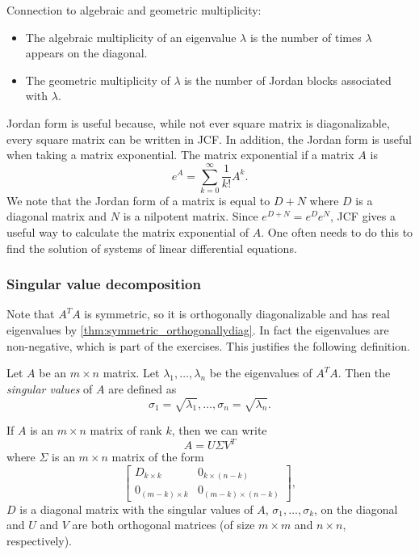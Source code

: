 \documentclass{article}
\begin{document}
Connection to algebraic and geometric multiplicity:
\begin{itemize}
    \item The algebraic multiplicity of an eigenvalue $\lambda$ is the number of times $\lambda$ appears on the diagonal.
    \item The geometric multiplicity of $\lambda$ is the number of Jordan blocks associated with $\lambda$.
\end{itemize}

Jordan form is useful because, while not ever square matrix is diagonalizable, every square matrix can be written in JCF. 
In addition, the Jordan form is useful when taking a matrix exponential. The matrix exponential if a matrix $A$ is
$$ e^A = \sum_{k=0}^\infty \frac{1}{k!}A^k.$$
We note that the Jordan form of a matrix is equal to $D + N$ where $D$ is a diagonal matrix and $N$ is a nilpotent matrix. Since $e^{D+N}=e^De^N$, JCF gives a useful way to calculate the matrix exponential of $A$. One often needs to do this to find the solution of systems of linear differential equations.


\subsubsection{Singular value decomposition}
Note that $A^T A$ is symmetric, so it is orthogonally diagonalizable and has real eigenvalues by \cref{thm:symmetric_orthogonallydiag}. In fact the eigenvalues are non-negative, which is part of the exercises. This justifies the following definition.

\begin{definition}
Let $A$ be an $m \times n$ matrix.  Let $\lambda_1, \ldots, \lambda_n$ be the eigenvalues of $A^T A$. Then the \emph{singular values} of $A$ are defined as
\begin{equation*}
    \sigma_1 = \sqrt{\lambda_1}, \ldots, \sigma_n = \sqrt{\lambda_n}.
\end{equation*}
\end{definition}

\begin{theorem}
If $A$ is an $m \times n$ matrix of rank $k$, then we can write
$$ A = U \Sigma V^T$$
where $\Sigma$ is an $m \times n$ matrix of the form
$$ \begin{bmatrix} D_{k \times k} & 0_{k \times (n - k)} \\ 0_{(m -k) \times k} & 0_{(m -k) \times (n-k)} \end{bmatrix},$$
$D$ is a diagonal matrix with the singular values of $A$, $ \sigma_1, \ldots, \sigma_k$, on the diagonal and $U$ and $V$ are both orthogonal matrices (of size $m \times m$ and $n \times n$, respectively).
\end{theorem}
\end{document}
